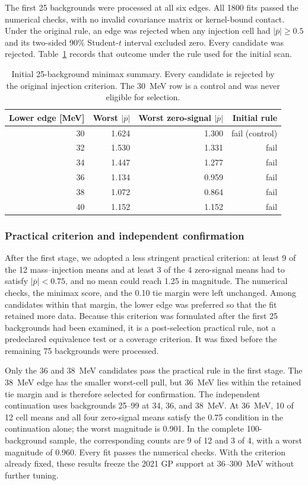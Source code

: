 The first 25 backgrounds were processed at all six edges.  All 1800 fits passed the
numerical checks, with no invalid covariance matrix or kernel-bound contact.  Under the
original rule, an edge was rejected when any injection cell had
$|\overline p|\geq0.5$ and its two-sided 90\% Student-$t$ interval excluded zero.
Every candidate was rejected.  Table~\ref{tab:v4p9p5-phase1} records that outcome under
the rule used for the initial scan.

\begin{table}[htbp]
\centering
\caption{Initial 25-background minimax summary.  Every candidate is rejected by the
original injection criterion.  The 30~MeV row is a control and was never eligible for
selection.}
\label{tab:v4p9p5-phase1}
\begin{tabular}{rrrr}
\toprule
Lower edge [MeV] & Worst $|\overline p|$ & Worst zero-signal $|\overline p|$ & Initial rule \\
\midrule
30 & 1.624 & 1.300 & fail (control) \\
32 & 1.530 & 1.331 & fail \\
34 & 1.447 & 1.277 & fail \\
36 & 1.134 & 0.959 & fail \\
38 & 1.072 & 0.864 & fail \\
40 & 1.152 & 1.152 & fail \\
\bottomrule
\end{tabular}
\end{table}

\subsubsection{Practical criterion and independent confirmation}

After the first stage, we adopted a less stringent practical criterion: at least 9 of
the 12 mass--injection means and at least 3 of the 4 zero-signal means had to satisfy
$|\overline p|<0.75$, and no mean could reach 1.25 in magnitude.  The numerical checks,
the minimax score, and the 0.10 tie margin were left unchanged.  Among candidates within
that margin, the lower edge was preferred so that the fit retained more data.  Because
this criterion was formulated after the first 25 backgrounds had been examined, it is
a post-selection practical rule, not a predeclared equivalence test or a coverage
criterion.  It was fixed before the remaining 75 backgrounds were processed.

Only the 36 and 38~MeV candidates pass the practical rule in the first stage.  The
38~MeV edge has the smaller worst-cell pull, but 36~MeV lies within the retained tie
margin and is therefore selected for confirmation.  The independent continuation uses
backgrounds 25--99 at 34, 36, and 38~MeV.  At 36~MeV, 10 of 12 cell means and all four
zero-signal means satisfy the 0.75 condition in the continuation alone; the worst
magnitude is 0.901.  In the complete 100-background sample, the corresponding counts
are 9 of 12 and 3 of 4, with a worst magnitude of 0.960.  Every fit passes the numerical
checks.  With the criterion already fixed, these results freeze the 2021 GP support at
36--300~MeV without further tuning.

